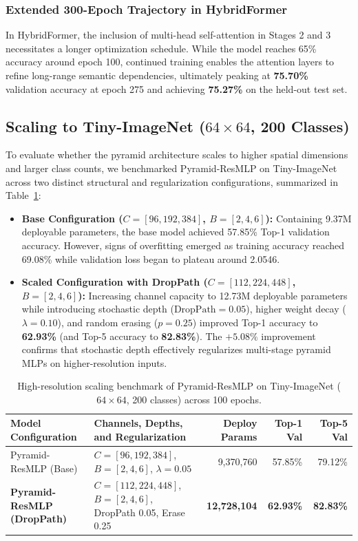 \subsubsection{Extended 300-Epoch Trajectory in HybridFormer}
In HybridFormer, the inclusion of multi-head self-attention in Stages 2 and 3 necessitates a longer optimization schedule. While the model reaches 65\% accuracy around epoch 100, continued training enables the attention layers to refine long-range semantic dependencies, ultimately peaking at \textbf{75.70\%} validation accuracy at epoch 275 and achieving \textbf{75.27\%} on the held-out test set.

\subsection{Scaling to Tiny-ImageNet (\texorpdfstring{$64 \times 64$}{64x64}, 200 Classes)}
To evaluate whether the pyramid architecture scales to higher spatial dimensions and larger class counts, we benchmarked Pyramid-ResMLP on Tiny-ImageNet across two distinct structural and regularization configurations, summarized in Table~\ref{tab:tiny_imagenet_scaling}:
\begin{itemize}
    \item \textbf{Base Configuration ($C=[96, 192, 384]$, $B=[2, 4, 6]$):} Containing 9.37M deployable parameters, the base model achieved 57.85\% Top-1 validation accuracy. However, signs of overfitting emerged as training accuracy reached 69.08\% while validation loss began to plateau around 2.0546.
    \item \textbf{Scaled Configuration with DropPath ($C=[112, 224, 448]$, $B=[2, 4, 6]$):} Increasing channel capacity to 12.73M deployable parameters while introducing stochastic depth ($\text{DropPath} = 0.05$), higher weight decay ($\lambda = 0.10$), and random erasing ($p=0.25$) improved Top-1 accuracy to \textbf{62.93\%} (and Top-5 accuracy to \textbf{82.83\%}). The $+5.08\%$ improvement confirms that stochastic depth effectively regularizes multi-stage pyramid MLPs on higher-resolution inputs.
\end{itemize}

\begin{table}[htbp]
\centering
\small
\begin{tabularx}{\textwidth}{l >{\raggedright\arraybackslash}X r r r}
\toprule
\textbf{Model Configuration} & \textbf{Channels, Depths, and Regularization} & \textbf{Deploy Params} & \textbf{Top-1 Val} & \textbf{Top-5 Val} \\
\midrule
Pyramid-ResMLP (Base) & $C=[96, 192, 384]$, $B=[2, 4, 6]$, $\lambda=0.05$ & 9,370,760 & 57.85\% & 79.12\% \\
\textbf{Pyramid-ResMLP (DropPath)} & $C=[112, 224, 448]$, $B=[2, 4, 6]$, DropPath 0.05, Erase 0.25 & \textbf{12,728,104} & \textbf{62.93\%} & \textbf{82.83\%} \\
\bottomrule
\end{tabularx}
\vspace{0.4em}
\caption{High-resolution scaling benchmark of Pyramid-ResMLP on Tiny-ImageNet ($64 \times 64$, 200 classes) across 100 epochs.}
\label{tab:tiny_imagenet_scaling}
\end{table}

